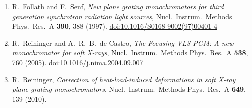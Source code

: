 \documentclass[12pt,a4paper]{article}
\begin{document}
\begin{enumerate}
  \item R.\ Follath and F.\ Senf,
        \textit{New plane grating monochromators for third generation synchrotron
        radiation light sources},
        Nucl.\ Instrum.\ Methods Phys.\ Res.\ A \textbf{390}, 388 (1997).
        \href{https://doi.org/10.1016/S0168-9002(97)00401-4}{doi:10.1016/S0168-9002(97)00401-4}

  \item R.\ Reininger and A.\ R.\ B.\ de Castro,
        \textit{The Focusing VLS-PGM: A new monochromator for soft X-rays},
        Nucl.\ Instrum.\ Methods Phys.\ Res.\ A \textbf{538}, 760 (2005).
        \href{https://doi.org/10.1016/j.nima.2004.09.007}{doi:10.1016/j.nima.2004.09.007}

  \item R.\ Reininger,
        \textit{Correction of heat-load-induced deformations in soft X-ray plane grating
        monochromators},
        Nucl.\ Instrum.\ Methods Phys.\ Res.\ A \textbf{649}, 139 (2010).
\end{enumerate}
\end{document}
